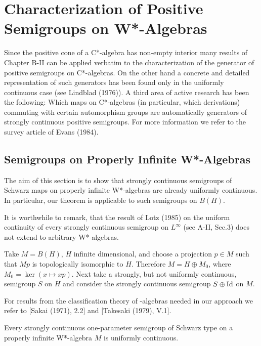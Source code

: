 
\chapter{Characterization of Positive Semigroups on W*-Algebras}

Since the positive cone of a C*-algebra has non-empty interior many results of Chapter B-II can be applied verbatim to the characterization of the generator of positive semigroups on C*-algebras.
On the other hand a concrete and detailed representation of such generators has been found only in the uniformly continuous case (see Lindblad (1976)).
A third area of active research has been the following: Which maps on C*-algebras (in particular, which derivations) commuting with certain automorphism groups are automatically generators of strongly continuous positive semigroups.
For more information we refer to the survey article of Evans (1984).

\section{Semigroups on Properly Infinite W*-Algebras}

The aim of this section is to show that strongly continuous semigroups of Schwarz maps on properly infinite W*-algebras are already uniformly continuous.
In particular, our theorem is applicable to such semigroups on $B(H)$.

It is worthwhile to remark, that the result of Lotz (1985) on the uniform continuity of every strongly continuous semigroup on $L^\infty$ (see A-II, Sec.3) does not extend to arbitrary W*-algebras.
\begin{example}
Take $M = B(H)$, $H$ infinite dimensional, and choose a projection $p \in M$ such that $Mp$ is topologically isomorphic to $H$.
Therefore $M = H \oplus M_{0}$, where $M_{0} = \ker(x \mapsto xp)$.
Next take a strongly, but not uniformly continuous, semigroup $S$ on $H$ and consider the strongly continuous semigroup $S \oplus \operatorname{Id}$ on $M$.
\end{example}
For results from the classification theory of \WA-algebras needed in our approach we refer to [Sakai (1971), 2.2] and [Takesaki (1979), V.1].

\begin{theorem}\label{thm:schwarz_uniform}
Every strongly continuous one-parameter semigroup of Schwarz type on a properly infinite W*-algebra $M$ is uniformly continuous.
\end{theorem}

